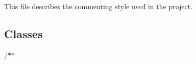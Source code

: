 This file describes the commenting style used in the project.

\subsection*{Classes }

/$\ast$$\ast$ 